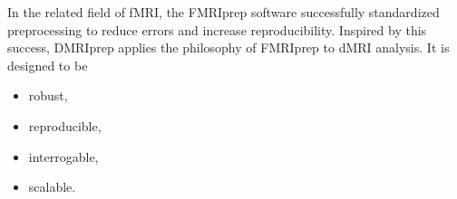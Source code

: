 \documentclass[a0paper,portrait,fontscale=0.395]{baposter}
\newenvironment{Figure}
  {\par\medskip\noindent\minipage{\linewidth}}
  {\endminipage\par\medskip}
\begin{document}
\begin{poster}
{\begin{Figure}
\end{Figure}

\noindent In the related field of fMRI, the FMRIprep software\cite{esteban2019fmriprep} successfully standardized preprocessing to reduce errors and increase reproducibility. Inspired by this success, DMRIprep applies the philosophy of FMRIprep to dMRI analysis. It is designed to be
\vspace{-0.5em}
\begin{multicols}{2}
\begin{itemize}[nosep]
    \item robust,
    \item reproducible,
    \item interrogable,
    \item scalable.
\end{itemize}
\end{multicols}
}


\end{poster}
\end{document}
